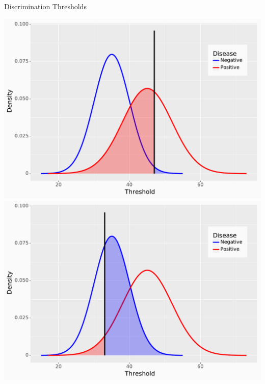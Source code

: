 \documentclass[10pt, xcolor=table]{beamer}
\begin{document}
\begin{frame}{Discrimination Thresholds}
	\begin{center}
		\includegraphics[height=0.45\textheight]{images/overlap_distr_thi.pdf}\\
		\includegraphics[height=0.45\textheight]{images/overlap_distr_tlow.pdf}
	\end{center}
\end{frame}

\end{document}
